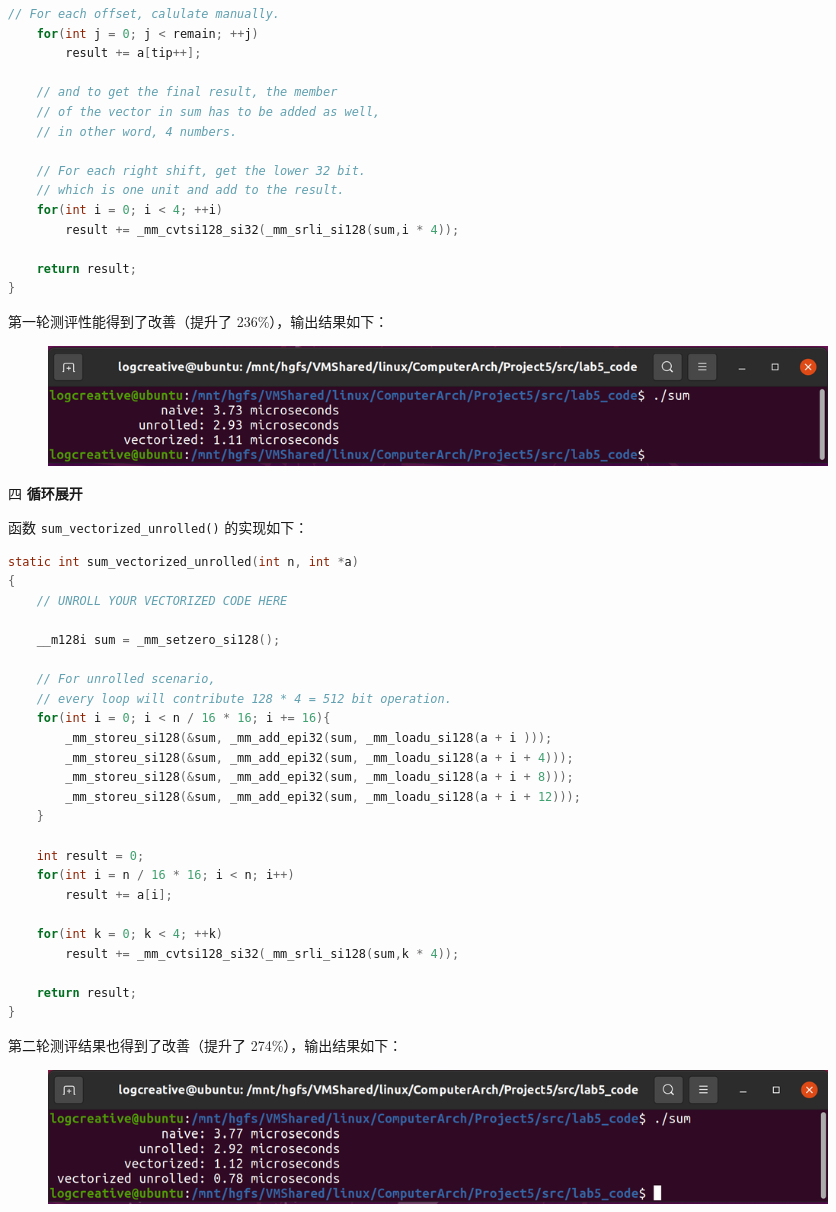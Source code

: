 \documentclass[12pt,a4paper]{article}
\newenvironment{problems}{\begin{list}{}{\renewcommand{\makelabel}[1]{\textbf{##1}.\hfil}}}{\end{list}}
\begin{document}
\begin{problems}
\begin{lstlisting}[language=c]
	// For each offset, calulate manually.
	for(int j = 0; j < remain; ++j)
		result += a[tip++];

	// and to get the final result, the member
	// of the vector in sum has to be added as well,
	// in other word, 4 numbers.
	
	// For each right shift, get the lower 32 bit.
	// which is one unit and add to the result.
	for(int i = 0; i < 4; ++i)
		result += _mm_cvtsi128_si32(_mm_srli_si128(sum,i * 4));

    return result;
}
	\end{lstlisting}

	第一轮测评性能得到了改善（提升了 236\%），输出结果如下：
	\begin{figure}[h]
		\centering
		\includegraphics[width=\textwidth]{benchmark1.png}
	\end{figure}
	
	\item[四] \textbf{循环展开}
	
	函数 \verb"sum_vectorized_unrolled()" 的实现如下：
	\begin{lstlisting}[language=c]
static int sum_vectorized_unrolled(int n, int *a)
{
    // UNROLL YOUR VECTORIZED CODE HERE

	__m128i sum = _mm_setzero_si128();

	// For unrolled scenario,
	// every loop will contribute 128 * 4 = 512 bit operation.
	for(int i = 0; i < n / 16 * 16; i += 16){
		_mm_storeu_si128(&sum, _mm_add_epi32(sum, _mm_loadu_si128(a + i )));
		_mm_storeu_si128(&sum, _mm_add_epi32(sum, _mm_loadu_si128(a + i + 4)));
		_mm_storeu_si128(&sum, _mm_add_epi32(sum, _mm_loadu_si128(a + i + 8)));
		_mm_storeu_si128(&sum, _mm_add_epi32(sum, _mm_loadu_si128(a + i + 12)));
	}
	
	int result = 0;
	for(int i = n / 16 * 16; i < n; i++)
		result += a[i];
	
	for(int k = 0; k < 4; ++k)
		result += _mm_cvtsi128_si32(_mm_srli_si128(sum,k * 4));

    return result;
}
	\end{lstlisting}

	第二轮测评结果也得到了改善（提升了 274\%），输出结果如下：
	\begin{figure}[h]
		\centering
		\includegraphics[width=\textwidth]{benchmark2.png}
	\end{figure}


\end{problems}
\end{document}

